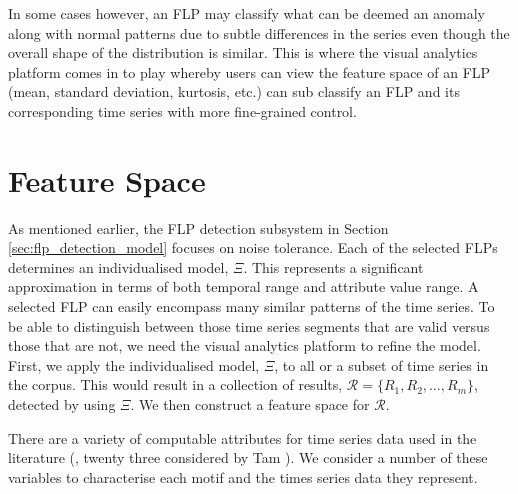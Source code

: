 In some cases however, an FLP may classify what can be deemed an anomaly along with normal patterns due to subtle differences in the series even though the overall shape of the distribution is similar. This is where the visual analytics platform comes in to play whereby users can view the feature space of an FLP (mean, standard deviation, kurtosis, etc.) can sub classify an FLP and its corresponding time series with more fine-grained control.

\section{Feature Space}
\label{sec:feature_space}

As mentioned earlier, the FLP detection subsystem in Section \ref{sec:flp_detection_model} focuses on noise tolerance. Each of the selected FLPs determines an individualised model, $\Xi$.
This represents a significant approximation in terms of both temporal range and attribute value range.
A selected FLP can easily encompass many similar patterns of the time series.
To be able to distinguish between those time series segments that are valid versus those that are not, we need the visual analytics platform to refine the model.
First, we apply the individualised model, $\Xi$, to all or a subset of time series in the corpus. This would result in a collection of results,
$\mathcal{R} = \{R_1, R_2, \ldots, R_m\}$, detected by using $\Xi$.
We then construct a feature space for $\mathcal{R}$.

There are a variety of computable attributes for time series data used in the literature (\eg, twenty three considered by Tam \etal \cite{tam2011}). We consider a number of these variables to characterise each motif and the times series data they represent.  


